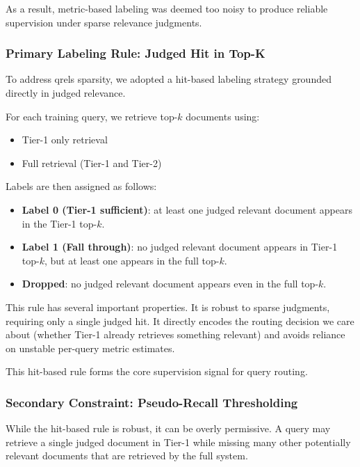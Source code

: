 \documentclass[11pt]{article}
\begin{document}
As a result, metric-based labeling was deemed too noisy to produce reliable supervision under sparse relevance judgments.

\subsubsection{Primary Labeling Rule: Judged Hit in Top-K}

To address qrels sparsity, we adopted a hit-based labeling strategy grounded directly in judged relevance.

\vspace{\topsep}
\noindent For each training query, we retrieve top-$k$ documents using:
\begin{itemize}
    \item Tier-1 only retrieval
    \item Full retrieval (Tier-1 and Tier-2)
\end{itemize}

\noindent Labels are then assigned as follows:
\begin{itemize}
    \item \textbf{Label 0 (Tier-1 sufficient)}: at least one judged relevant document appears in the Tier-1 top-$k$.
    \item \textbf{Label 1 (Fall through)}: no judged relevant document appears in Tier-1 top-$k$, but at least one appears in the full top-$k$.
    \item \textbf{Dropped}: no judged relevant document appears even in the full top-$k$.
\end{itemize}

\noindent This rule has several important properties. It is robust to sparse judgments, requiring only a single judged hit. It directly encodes the routing decision we care about (whether Tier-1 already retrieves something relevant) and avoids reliance on unstable per-query metric estimates.

This hit-based rule forms the core supervision signal for query routing.

\subsubsection{Secondary Constraint: Pseudo-Recall Thresholding}

While the hit-based rule is robust, it can be overly permissive. A query may retrieve a single judged document in Tier-1 while missing many other potentially relevant documents that are retrieved by the full system.
\end{document}
